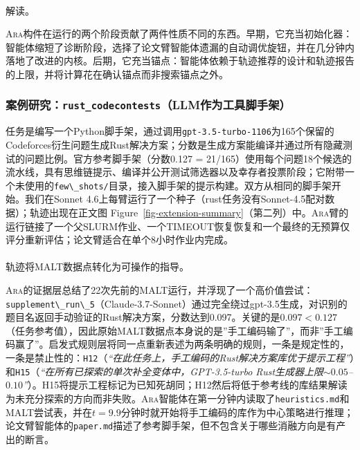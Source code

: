 \documentclass[
]{article}
\makeatletter
\let\oldparagraph\paragraph
\renewcommand{\paragraph}{
    \@ifstar
      \xxxParagraphStar
      \xxxParagraphNoStar
  }
\newcommand{\xxxParagraphStar}[1]{\oldparagraph*{#1}\mbox{}}
\newcommand{\xxxParagraphNoStar}[1]{\oldparagraph{#1}\mbox{}}
\newcommand{\passthrough}[1]{#1}
\theoremstyle{definition}
\newcommand{\ara}{\textsc{Ara}}
\makeatother
\begin{document}
\paragraph{解读。}\label{ux89e3ux8bfb}

\ara{}构件在运行的两个阶段贡献了两件性质不同的东西。早期，它充当初始化器：智能体缩短了诊断阶段，选择了论文臂智能体遗漏的自动调优旋钮，并在几分钟内落地了改进的内核。后期，它充当锚点：智能体依赖于轨迹推荐的设计和轨迹报告的上限，并将计算花在确认锚点而非搜索锚点之外。

\subsubsection{\texorpdfstring{案例研究：\texttt{rust\_codecontests}（LLM作为工具脚手架）}{案例研究：rust\_codecontests（LLM作为工具脚手架）}}\label{sec-eval-extension-rust}

任务是编写一个Python脚手架，通过调用\passthrough{\lstinline!gpt-3.5-turbo-1106!}为165个保留的Codeforces衍生问题生成Rust解决方案；分数是生成方案能编译并通过所有隐藏测试的问题比例。官方参考脚手架（分数0.127
=
21/165）使用每个问题18个候选的流水线，具有思维链提示、编译并公开测试筛选器以及幸存者投票阶段；它附带一个未使用的\passthrough{\lstinline!few\_shots/!}目录，接入脚手架的提示构建。双方从相同的脚手架开始。我们在Sonnet
4.6上每臂运行了一个种子（rust任务没有Sonnet-4.5配对数据）；轨迹出现在正文图
Figure~\ref{fig-extension-summary}（第二列）中。\ara{}臂的运行链接了一个父SLURM作业、一个TIMEOUT恢复恢复和一个最终的无预算仅评分重新评估；论文臂适合在单个8小时作业内完成。

\paragraph{轨迹将MALT数据点转化为可操作的指导。}\label{ux8f68ux8ff9ux5c06maltux6570ux636eux70b9ux8f6cux5316ux4e3aux53efux64cdux4f5cux7684ux6307ux5bfc}

\ara{}的证据层总结了22次先前的MALT运行，并浮现了一个高价值尝试：\passthrough{\lstinline!supplement\_run\_5!}（Claude-3.7-Sonnet）通过完全绕过gpt-3.5生成，对识别的题目名返回手动验证的Rust解决方案，分数达到0.097。关键的是\(0.097 < 0.127\)（任务参考值），因此原始MALT数据点本身说的是''手工编码输了''，而非''手工编码赢了''。启发式规则层将同一点重新表述为两条明确的规则，一条是规定性的，一条是禁止性的：\passthrough{\lstinline!H12!}（\emph{``在此任务上，手工编码的Rust解决方案库优于提示工程''}）和\passthrough{\lstinline!H15!}（\emph{``在所有已探索的单次补全变体中，GPT-3.5-turbo
Rust生成器上限\({\sim}0.05\)--\(0.10\)''}）。H15将提示工程标记为已知死胡同；H12然后将低于参考线的库结果解读为未充分探索的方向而非失败。\ara{}智能体在第一分钟内读取了\passthrough{\lstinline!heuristics.md!}和MALT尝试表，并在\(t = 9.9\)分钟时就开始将手工编码的库作为中心策略进行推理；论文臂智能体的\passthrough{\lstinline!paper.md!}描述了参考脚手架，但不包含关于哪些消融方向是有产出的断言。
\end{document}
